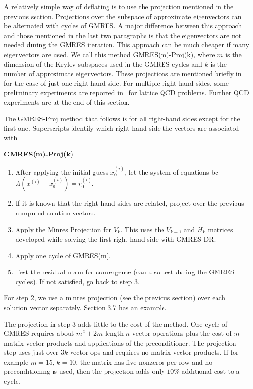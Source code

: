 \documentclass[final]{siamltex}
\begin{document}
A relatively simple way of deflating is to use the projection mentioned in the previous section.  Projections over the subspace of approximate eigenvectors can be alternated with cycles of GMRES.  A major difference between this approach and  those mentioned in the last two paragraphs is that the eigenvectors are not needed during the GMRES iteration.  This approach can be much cheaper if many eigenvectors are used.  We call this method GMRES(m)-Proj(k), where $m$ is the dimension of the Krylov subspaces used in the GMRES cycles and $k$ is the number of approximate eigenvectors.  These projections are mentioned briefly in~\cite{GMRES-DR} for the case of just one right-hand side.  For multiple right-hand sides, some preliminary experiments are reported in~\cite{Qcdconf} for lattice QCD problems.  Further QCD experiments are at the end of this section.  

The GMRES-Proj method that follows is for all right-hand sides except for the first one.  Superscripts identify which right-hand side the vectors are associated with.  
\vspace{.10in}
\begin{center}
\textbf{GMRES(m)-Proj(k)}
\end{center}
\begin{enumerate}
 \item After applying the initial guess $x_0^{(i)}$, let the system
of equations be $A(x^{(i)}-x_0^{(i)}) = r_0^{(i)}$.  
 \item If it is known that the right-hand sides are related, project over the previous computed solution vectors.
 \item Apply the Minres Projection for $V_k$.  This uses the $V_{k+1}$ and $\bar H_k$ matrices developed while solving the first right-hand side with GMRES-DR.
 \item Apply one cycle of GMRES(m).
 \item Test the residual norm for convergence (can also test during the GMRES cycles).  If not satisfied, go back to step 3.
\end{enumerate} 
\vspace{.15in}

For step 2, we use a minres projection (see the previous section) over each solution vector separately.  Section 3.7 has an example.

The projection in step 3 adds little to the cost of the method.  One cycle of GMRES requires about $m^2 + 2m$ length $n$ vector operations plus the cost of $m$ matrix-vector products and applications of the preconditioner.  The projection step uses just over $3k$ vector ops and requires no matrix-vector products.  If for example $m=15$, $k=10$, the matrix has five nonzeros per row and no preconditioning is used, then the projection adds only $10 \%$ additional cost to a cycle.  
\end{document}
